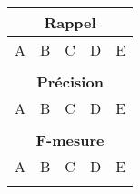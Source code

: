 \begin{tabular}{p{2cm}|p{2cm}|p{2cm}|p{2cm}|p{2cm}}
\multicolumn{5}{c}{\textbf{Rappel}}			\\
\hline	
A	&B	&C	&D	&E\\
\hline				
	&	&	&	&\\
\hline				
\hline				
 \multicolumn{5}{c}{\textbf{Précision}}			\\
\hline				
A	&B	&C	&D	&E\\
\hline				
	&	&	&	&\\
\hline				
\hline				
 \multicolumn{5}{c}{\textbf{F-mesure}}				\\
\hline				
A	&B	&C	&D	&E\\
\hline				
	&	&	&	&\\
\hline				
\end{tabular}

